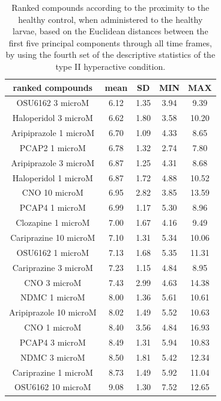 \documentclass[a4paper,12pt]{article}
\begin{document}
\begin{table}[h!]\tiny
\centering
\caption{Ranked compounds according to the proximity to the healthy control, when administered to the healthy larvae, based on the Euclidean distances between the first five principal components through all time frames, by using the fourth set of the descriptive statistics of the type II hyperactive condition.}
\begin{tabular}{|c|c|c|c|c|}
\hline
ranked compounds             & mean & SD   & MIN  & MAX   \\ \hline
OSU6162 3 microM       & 6.12  & 1.35 & 3.94 & 9.39  \\ \hline
Haloperidol 3 microM   & 6.62  & 1.80  & 3.58 & 10.20  \\ \hline
Aripiprazole 1 microM  & 6.70   & 1.09 & 4.33 & 8.65  \\ \hline
PCAP2 1 microM         & 6.78  & 1.32 & 2.74 & 7.80   \\ \hline
Aripiprazole 3 microM  & 6.87  & 1.25 & 4.31 & 8.68  \\ \hline
Haloperidol 1 microM   & 6.87  & 1.72 & 4.88 & 10.52 \\ \hline
CNO 10 microM          & 6.95  & 2.82 & 3.85 & 13.59 \\ \hline
PCAP4 1 microM       & 6.99  & 1.17 & 5.30  & 8.96  \\ \hline
Clozapine 1 microM     & 7.00     & 1.67 & 4.16 & 9.49  \\ \hline
Cariprazine 10 microM  & 7.10   & 1.31 & 5.34 & 10.06 \\ \hline
OSU6162 1 microM       & 7.13  & 1.68 & 5.35 & 11.31 \\ \hline
Cariprazine 3 microM   & 7.23  & 1.15 & 4.84 & 8.95  \\ \hline
CNO 3 microM           & 7.43  & 2.99 & 4.63 & 14.38 \\ \hline
NDMC 1 microM          & 8.00     & 1.36 & 5.61 & 10.61 \\ \hline
Aripiprazole 10 microM & 8.02  & 1.49 & 5.52 & 10.63 \\ \hline
CNO 1 microM           & 8.40   & 3.56 & 4.84 & 16.93 \\ \hline
PCAP4 3 microM       & 8.49  & 1.31 & 5.94 & 10.83 \\ \hline
NDMC 3 microM          & 8.50   & 1.81 & 5.42 & 12.34 \\ \hline
Cariprazine 1 microM   & 8.73  & 1.49 & 5.92 & 11.04 \\ \hline
OSU6162 10 microM      & 9.08  & 1.30  & 7.52 & 12.65 \\ \hline

\end{tabular}
\end{table}
\end{document}
